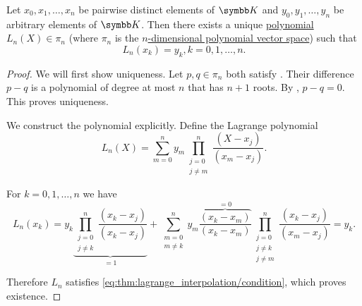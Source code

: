 \begin{theorem}\label{thm:lagrange_interpolation}
  Let \( x_0, x_1, \ldots, x_n \) be pairwise distinct elements of \( \BK \) and \( y_0, y_1, \ldots, y_n \) be arbitrary elements of \( \BK \). Then there exists a unique \hyperref[def:polynomial]{polynomial} \( L_n(X) \in \pi_n \) (where \( \pi_n \) is the \hyperref[def:polynomial_free_module]{\( n \)-dimensional polynomial vector space}) such that
  \begin{equation}\label{eq:thm:lagrange_interpolation/condition}
    L_n(x_k) = y_k, k = 0, 1, \ldots, n.
  \end{equation}
\end{theorem}
\begin{proof}
  We will first show uniqueness. Let \( p, q \in \pi_n \) both satisfy . Their difference \( p - q \) is a polynomial of degree at most \( n \) that has \( n + 1 \) roots. By , \( p - q = 0 \). This proves uniqueness.

  We construct the polynomial explicitly. Define the Lagrange polynomial
  \begin{equation*}
    L_n(X) = \sum_{m=0}^n y_m \prod_{\substack{j = 0 \\ j \neq m}}^n \frac {(X - x_j)} {(x_m - x_j)}.
  \end{equation*}

  For \( k = 0, 1, \ldots, n \) we have
  \begin{equation*}
    L_n(x_k) = y_k \underbrace{\prod_{\substack{j = 0 \\ j \neq k}}^n \frac {(x_k - x_j)} {(x_k - x_j)}}_{=1} + \sum_{\substack{m = 0 \\ m \neq k}}^n y_m \overbrace{\frac{(x_k - x_m)}{(x_k - x_m)}}^{=0} \prod_{\substack{j = 0 \\ j \neq k \\ j \neq m}}^n \frac {(x_k - x_j)} {(x_m - x_j)} = y_k.
  \end{equation*}

  Therefore \( L_n \) satisfies \eqref{eq:thm:lagrange_interpolation/condition}, which proves existence.
\end{proof}
